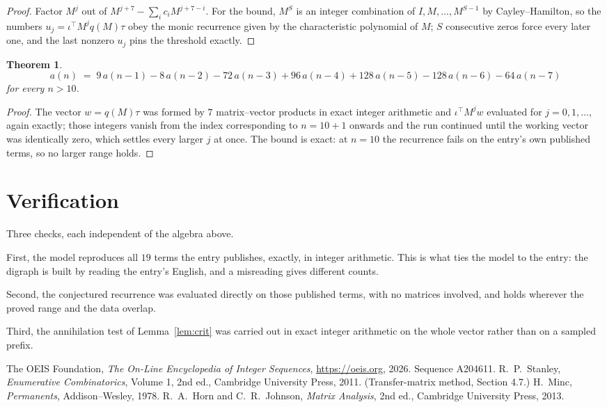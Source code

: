 \documentclass[11pt,a4paper]{article}
\theoremstyle{plain}
\newtheorem{theorem}{Theorem}
\theoremstyle{definition}
\begin{document}
\begin{proof}
Factor $M^{j}$ out of $M^{j+7}-\sum_ic_iM^{j+7-i}$. For the bound, $M^{S}$
is an integer combination of $I,M,\dots,M^{S-1}$ by Cayley--Hamilton, so the numbers
$u_j=\iota^{\!\top}M^{j}q(M)\tau$ obey the monic recurrence given by the characteristic
polynomial of $M$; $S$ consecutive zeros force every later one, and the last nonzero $u_j$
pins the threshold exactly.
\end{proof}

\begin{theorem}
\[
a(n)\;=\;9\,a(n-1) - 8\,a(n-2) - 72\,a(n-3) + 96\,a(n-4) + 128\,a(n-5) - 128\,a(n-6) - 64\,a(n-7)
\]
for every $n>10$.
\end{theorem}

\begin{proof}
The vector $w=q(M)\tau$ was formed by $7$ matrix--vector products in exact integer
arithmetic and $\iota^{\!\top}M^{j}w$ evaluated for $j=0,1,\dots$, again exactly; those
integers vanish from the index corresponding to $n=10+1$ onwards and the run continued
until the working vector was identically zero, which settles every larger $j$ at once. The bound is exact: at $n=10$ the recurrence fails on the entry's own published terms, so no larger range holds.
\end{proof}

\section{Verification}

Three checks, each independent of the algebra above.

First, the model reproduces all $19$ terms the entry publishes, exactly, in integer
arithmetic. This is what ties the model to the entry: the digraph is built by reading the
entry's English, and a misreading gives different counts.

Second, the conjectured recurrence was evaluated directly on those published terms, with no
matrices involved, and holds wherever the proved range and the data overlap.

Third, the annihilation test of Lemma~\ref{lem:crit} was carried out in exact integer
arithmetic on the whole vector rather than on a sampled prefix.

\begin{thebibliography}{9}
 The OEIS Foundation, \emph{The On-Line Encyclopedia of Integer
Sequences}, \url{https://oeis.org}, 2026. Sequence A204611.
 R.~P.~Stanley, \emph{Enumerative Combinatorics}, Volume 1, 2nd ed.,
Cambridge University Press, 2011. (Transfer-matrix method, Section 4.7.)
 H.~Minc, \emph{Permanents}, Addison--Wesley, 1978.
 R.~A.~Horn and C.~R.~Johnson, \emph{Matrix Analysis}, 2nd ed., Cambridge
University Press, 2013.
\end{thebibliography}
\end{document}
